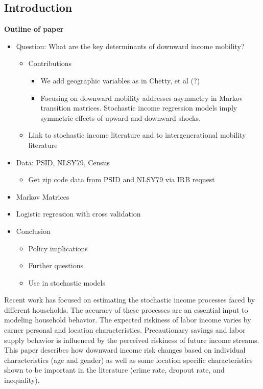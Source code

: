 \documentclass[letterpaper,12pt]{article}
\theoremstyle{definition}
\begin{document}
\begin{spacing}{1.5}

\section{Introduction}\label{SecIntro}

  \textbf{Outline of paper}
  \begin{itemize}
    \item Question: What are the key determinants of downward income mobility?
    \begin{itemize}
      \item Contributions
      \begin{itemize}
        \item We add geographic variables as in Chetty, et al (?)
        \item Focusing on downward mobility addresses asymmetry in Markov transition matrices. Stochastic income regression models imply symmetric effects of upward and downward shocks.
      \end{itemize}
      \item Link to stochastic income literature and to intergenerational mobility literature
    \end{itemize}
    \item Data: PSID, NLSY79, Census
    \begin{itemize}
      \item Get zip code data from PSID and NLSY79 via IRB request
    \end{itemize}
    \item Markov Matrices
    \item Logistic regression with cross validation
    \item Conclusion
    \begin{itemize}
      \item Policy implications
      \item Further questions
      \item Use in stochastic models
    \end{itemize}
  \end{itemize}

  Recent work has focused on estimating the stochastic income processes faced by different households. The accuracy of these processes are an essential input to modeling household behavior. The expected riskiness of labor income varies by earner personal and location characteristics. Precautionary savings and labor supply behavior is influenced by the perceived riskiness of future income streams. This paper describes how downward income risk changes based on individual characteristics (age and gender) as well as some location specific characteristics shown to be important in the literature (crime rate, dropout rate, and inequality).


\end{spacing}
\end{document}
